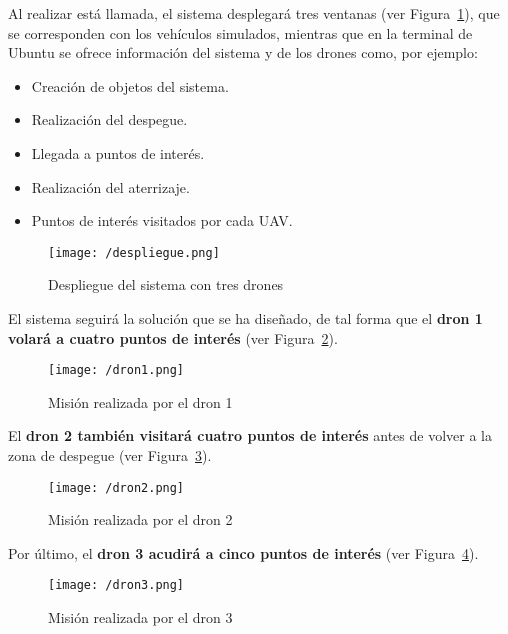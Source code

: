 Al realizar está llamada, el sistema desplegará tres ventanas (ver Figura~\ref{fig:despliegue}), que se corresponden con los vehículos simulados, mientras que en la terminal de Ubuntu se ofrece información del sistema y de los drones como, por ejemplo: 
\begin{itemize}
\item Creación de objetos del sistema.
\item Realización del despegue.
\item Llegada a puntos de interés.
\item Realización del aterrizaje.
\item Puntos de interés visitados por cada \acs{UAV}.
\end{itemize}

\begin{figure}[!h]
\begin{center}
\texttt{[image: /despliegue.png]}
\caption[Despliegue del sistema con tres drones]{Despliegue del sistema con tres drones}
\label{fig:despliegue}
\end{center}
\end{figure}

El sistema seguirá la solución que se ha diseñado, de tal forma que el \textbf{dron 1 volará a cuatro puntos de interés} (ver Figura~\ref{fig:dron1}).

\begin{figure}[!h]
\begin{center}
\texttt{[image: /dron1.png]}
\caption[Misión realizada por el dron 1]{Misión realizada por el dron 1}
\label{fig:dron1}
\end{center}
\end{figure}

El \textbf{dron 2 también visitará cuatro puntos de interés} antes de volver a la zona de despegue (ver Figura~\ref{fig:dron2}).

\begin{figure}[!h]
\begin{center}
\texttt{[image: /dron2.png]}
\caption[Misión realizada por el dron 2]{Misión realizada por el dron 2}
\label{fig:dron2}
\end{center}
\end{figure}

Por último, el \textbf{dron 3 acudirá a cinco puntos de interés} (ver Figura~\ref{fig:dron3}).

\begin{figure}[!h]
\begin{center}
\texttt{[image: /dron3.png]}
\caption[Misión realizada por el dron 3]{Misión realizada por el dron 3}
\label{fig:dron3}
\end{center}
\end{figure}

